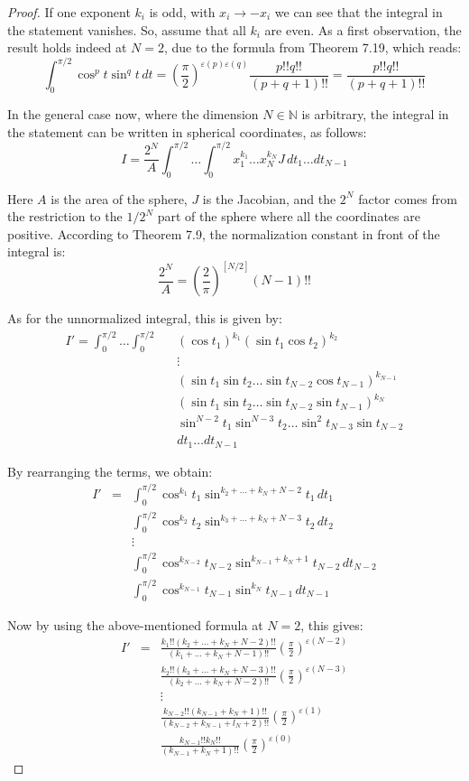 \documentclass[12pt]{amsbook}
\begin{document}
\begin{proof}
If one exponent $k_i$ is odd, with $x_i\to-x_i$ we can see that the integral in the statement vanishes. So, assume that all $k_i$ are even. As a first observation, the result holds indeed at $N=2$, due to the formula from Theorem 7.19, which reads:
$$\int_0^{\pi/2}\cos^pt\sin^qt\,dt
=\left(\frac{\pi}{2}\right)^{\varepsilon(p)\varepsilon(q)}\frac{p!!q!!}{(p+q+1)!!}
=\frac{p!!q!!}{(p+q+1)!!}$$

In the general case now, where the dimension $N\in\mathbb N$ is arbitrary, the integral in the statement can be written in spherical coordinates, as follows:
$$I=\frac{2^N}{A}\int_0^{\pi/2}\ldots\int_0^{\pi/2}x_1^{k_1}\ldots x_N^{k_N}J\,dt_1\ldots dt_{N-1}$$

Here $A$ is the area of the sphere, $J$ is the Jacobian, and the $2^N$ factor comes from the restriction to the $1/2^N$ part of the sphere where all the coordinates are positive. According to Theorem 7.9, the normalization constant in front of the integral is:
$$\frac{2^N}{A}=\left(\frac{2}{\pi}\right)^{[N/2]}(N-1)!!$$

As for the unnormalized integral, this is given by:
\begin{eqnarray*}
I'=\int_0^{\pi/2}\ldots\int_0^{\pi/2}
&&(\cos t_1)^{k_1}
(\sin t_1\cos t_2)^{k_2}\\
&&\vdots\\
&&(\sin t_1\sin t_2\ldots\sin t_{N-2}\cos t_{N-1})^{k_{N-1}}\\
&&(\sin t_1\sin t_2\ldots\sin t_{N-2}\sin t_{N-1})^{k_N}\\
&&\sin^{N-2}t_1\sin^{N-3}t_2\ldots\sin^2t_{N-3}\sin t_{N-2}\\
&&dt_1\ldots dt_{N-1}
\end{eqnarray*}

By rearranging the terms, we obtain:
\begin{eqnarray*}
I'
&=&\int_0^{\pi/2}\cos^{k_1}t_1\sin^{k_2+\ldots+k_N+N-2}t_1\,dt_1\\
&&\int_0^{\pi/2}\cos^{k_2}t_2\sin^{k_3+\ldots+k_N+N-3}t_2\,dt_2\\
&&\vdots\\
&&\int_0^{\pi/2}\cos^{k_{N-2}}t_{N-2}\sin^{k_{N-1}+k_N+1}t_{N-2}\,dt_{N-2}\\
&&\int_0^{\pi/2}\cos^{k_{N-1}}t_{N-1}\sin^{k_N}t_{N-1}\,dt_{N-1}
\end{eqnarray*}

Now by using the above-mentioned formula at $N=2$, this gives:
\begin{eqnarray*}
I'
&=&\frac{k_1!!(k_2+\ldots+k_N+N-2)!!}{(k_1+\ldots+k_N+N-1)!!}\left(\frac{\pi}{2}\right)^{\varepsilon(N-2)}\\
&&\frac{k_2!!(k_3+\ldots+k_N+N-3)!!}{(k_2+\ldots+k_N+N-2)!!}\left(\frac{\pi}{2}\right)^{\varepsilon(N-3)}\\
&&\vdots\\
&&\frac{k_{N-2}!!(k_{N-1}+k_N+1)!!}{(k_{N-2}+k_{N-1}+l_N+2)!!}\left(\frac{\pi}{2}\right)^{\varepsilon(1)}\\
&&\frac{k_{N-1}!!k_N!!}{(k_{N-1}+k_N+1)!!}\left(\frac{\pi}{2}\right)^{\varepsilon(0)}
\end{eqnarray*}


\end{proof}
\end{document}
